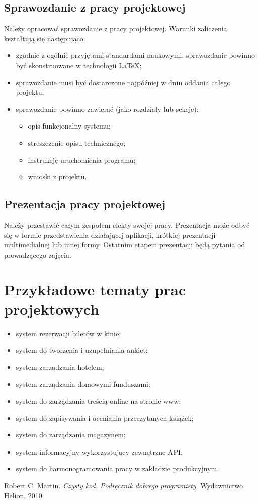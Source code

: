 \documentclass{article}
\begin{document}
	\subsection{Sprawozdanie z pracy projektowej}
	Należy opracować sprawozdanie z pracy projektowej. Warunki zaliczenia kształtują się następująco:
	
	\begin{itemize}
		\item zgodnie z ogólnie przyjętami standardami naukowymi, sprawozdanie powinno być skonstruowane w technologii \LaTeX;
		\item sprawozdanie musi być dostarczone najpóźniej w dniu oddania całego projektu;
		\item sprawozdanie powinno zawierać (jako rozdziały lub sekcje):
		\begin{itemize}
			\item opis funkcjonalny systemu;
			\item streszczenie opisu technicznego;
			\item instrukcję uruchomienia programu;
			\item wnioski z projektu.
		\end{itemize}
	\end{itemize}
	
	\subsection{Prezentacja pracy projektowej}
	Należy przestawić całym zespołem efekty swojej pracy. Prezentacja może odbyć się w formie przedstawienia działającej aplikacji, krótkiej prezentacji multimedialnej lub innej formy. Ostatnim etapem prezentacji będą pytania od prowadzącego zajęcia.
	
	\section{Przykładowe tematy prac projektowych}
	\begin{itemize}
		\item system rezerwacji biletów w kinie;
		\item system do tworzenia i uzupełniania ankiet;
		\item system zarządzania hotelem;
		\item system zarządzania domowymi funduszami;
		\item system do zarządzania treścią online na stronie www;
		\item system do zapisywania i oceniania przeczytanych książek;
		\item system do zarządzania magazynem;
		\item system informacyjny wykorzystujący zewnętrzne API;
		\item system do harmonogramowania pracy w zakładzie produkcyjnym.
	\end{itemize}

\begin{thebibliography}{9}	
	Robert C. Martin.
	\textit{Czysty kod. Podręcznik dobrego programisty}. 
	Wydawnictwo Helion, 2010.
\end{thebibliography}
\end{document}
